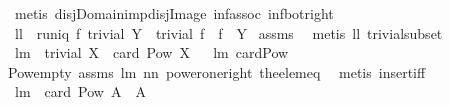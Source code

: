 \begin{isabellebody}
\ {\isacharparenleft}metis\ disj{\isacharunderscore}Domain{\isacharunderscore}imp{\isacharunderscore}disj{\isacharunderscore}Image\ inf{\isacharunderscore}assoc\ inf{\isacharunderscore}bot{\isacharunderscore}right{\isacharparenright}%
\endisatagproof
{\isafoldproof}%
%
\isadelimproof
\isanewline
%
\endisadelimproof
\isanewline
{}\isamarkupfalse%
\ ll{}{}{\isacharcolon}\ \ {\isachardoublequoteopen}runiq\ f{\isachardoublequoteclose}\ {\isachardoublequoteopen}trivial\ Y{\isachardoublequoteclose}\ \ {\isachardoublequoteopen}trivial\ {\isacharparenleft}f\ {\isacharbackquote}{\isacharbackquote}\ {\isacharparenleft}f{\isacharcircum}{\isacharminus}{}\ {\isacharbackquote}{\isacharbackquote}\ Y{\isacharparenright}{\isacharparenright}{\isachardoublequoteclose}\isanewline
%
\isadelimproof
%
\endisadelimproof
%
\isatagproof
{}\isamarkupfalse%
\ assms\ \isamarkupfalse%
\ {\isacharparenleft}metis\ ll{}{}\ trivial{\isacharunderscore}subset{\isacharparenright}%
\endisatagproof
{\isafoldproof}%
%
\isadelimproof
\isanewline
%
\endisadelimproof
\isanewline
{}\isamarkupfalse%
\ lm{}{}{}{\isacharcolon}\ \ {\isachardoublequoteopen}trivial\ X{\isachardoublequoteclose}\ \ {\isachardoublequoteopen}card\ {\isacharparenleft}Pow\ X{\isacharparenright}{\isasymin}{\isacharbraceleft}{}{\isacharcomma}{}{\isacharbraceright}{\isachardoublequoteclose}%
\isadelimproof
\ %
\endisadelimproof
%
\isatagproof
{}\isamarkupfalse%
\ lm{}{}{}\ card{\isacharunderscore}Pow\ \isanewline
Pow{\isacharunderscore}empty\ assms\ lm{}{}\ nn{}{}\ power{\isacharunderscore}one{\isacharunderscore}right\ the{\isacharunderscore}elem{\isacharunderscore}eq\ \isamarkupfalse%
\ {\isacharparenleft}metis\ insert{\isacharunderscore}iff{\isacharparenright}%
\endisatagproof
{\isafoldproof}%
%
\isadelimproof
%
\endisadelimproof
\isanewline
\isanewline
{}\isamarkupfalse%
\ lm{}{}{}{\isacharcolon}\ \ {\isachardoublequoteopen}card\ {\isacharparenleft}Pow\ A{\isacharparenright}{\isacharequal}{}{\isachardoublequoteclose}\ \ {\isachardoublequoteopen}A{\isacharequal}{\isacharbraceleft}{\isacharbraceright}{\isachardoublequoteclose}%
\isadelimproof
\ %
\endisadelimproof

\end{isabellebody}
